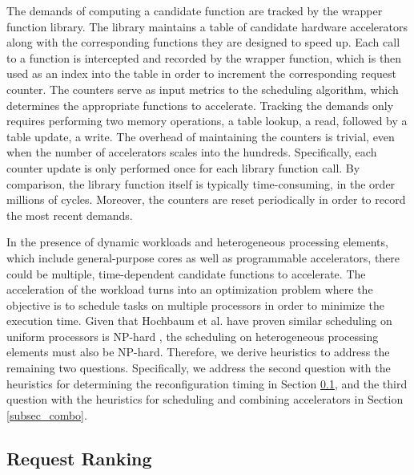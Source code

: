 The demands of computing a candidate function are tracked by the
wrapper function library. The library maintains a table of candidate
hardware accelerators along with the corresponding functions they are designed to speed up. Each call
to a function is intercepted and recorded by the wrapper function, which is then used as an
index into the table in order to increment the corresponding request counter. The
counters serve as input metrics to the scheduling algorithm, which determines the appropriate
functions to accelerate. Tracking the demands only requires performing two memory operations, a table
lookup, a read, followed by a table update, a write.
The overhead of maintaining the counters is trivial, even when the number
of accelerators scales into the hundreds. Specifically, each counter
update is only performed once for each library function call.  By comparison, the library function itself is typically time-consuming, in the order millions of cycles. Moreover, the counters are reset periodically in order to record the most recent demands. 


In the presence of dynamic workloads and heterogeneous processing
elements, which include general-purpose cores as well as programmable accelerators, there
could be multiple, time-dependent candidate functions to accelerate.
 The acceleration of the workload turns into an optimization
problem where the objective is to schedule tasks on multiple
processors in order to minimize the execution time. Given that Hochbaum et
al. have proven similar scheduling on uniform processors is NP-hard
\cite{hochbaum88}, the scheduling on heterogeneous processing 
elements must also be NP-hard. Therefore, we derive heuristics to address
the remaining two questions.
 Specifically, we address the second question with
the heuristics for determining the reconfiguration timing in
Section \ref{subsec_ranking}, and the third question with the heuristics for
scheduling and combining accelerators in Section \ref{subsec_combo}.

\subsection{Request Ranking}
\label{subsec_ranking}

